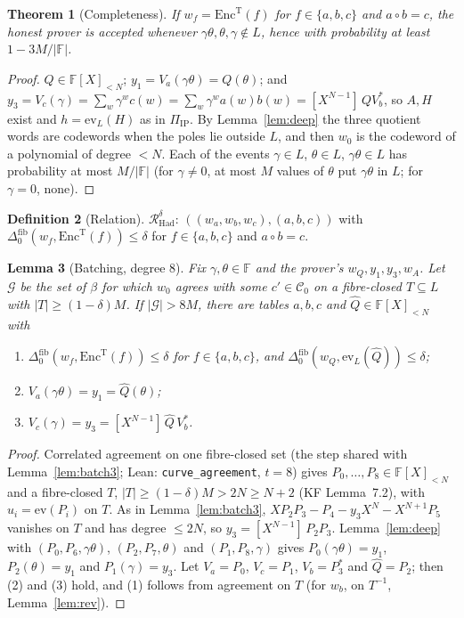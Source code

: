 \documentclass[11pt]{article}
\newtheorem{theorem}{Theorem}
\newtheorem{lemma}[theorem]{Lemma}
\theoremstyle{definition}
\newtheorem{definition}[theorem]{Definition}
\newcommand{\F}{\mathbb{F}}
\newcommand{\coef}[2]{[X^{#1}]\,#2}
\newcommand{\ev}{\mathrm{ev}}
\newcommand{\Cc}{\mathcal{C}}
\begin{document}
\begin{theorem}[Completeness]
If $w_f=\mathrm{Enc}^{\mathrm T}(f)$ for $f\in\{a,b,c\}$ and $a\circ b=c$, the honest prover is accepted whenever $\gamma\theta,\theta,\gamma\notin L$, hence with probability at least $1-3M/|\F|$.
\end{theorem}
\begin{proof}
$Q\in\F[X]_{<N}$; $y_1=V_a(\gamma\theta)=Q(\theta)$; and $y_3=V_c(\gamma)=\sum_w\gamma^wc(w)=\sum_w\gamma^wa(w)b(w)=\coef{N-1}{QV_b^\ast}$, so $A,H$ exist and $h=\ev_L(H)$ as in $\Pi_{\mathrm{IP}}$.
By Lemma~\ref{lem:deep} the three quotient words are codewords when the poles lie outside $L$, and then $w_0$ is the codeword of a polynomial of degree $<N$.
Each of the events $\gamma\in L$, $\theta\in L$, $\gamma\theta\in L$ has probability at most $M/|\F|$ (for $\gamma\ne0$, at most $M$ values of $\theta$ put $\gamma\theta$ in $L$; for $\gamma=0$, none).
\end{proof}

\begin{definition}[Relation]
$\mathcal R^\delta_{\mathrm{Had}}$: $((w_a,w_b,w_c),(a,b,c))$ with $\Delta^{\mathrm{fib}}_0(w_f,\mathrm{Enc}^{\mathrm T}(f))\le\delta$ for $f\in\{a,b,c\}$ and $a\circ b=c$.
\end{definition}

\begin{lemma}[Batching, degree $8$]\label{lem:batch8}
Fix $\gamma,\theta\in\F$ and the prover's $w_Q,y_1,y_3,w_A$.
Let $\mathcal G$ be the set of $\beta$ for which $w_0$ agrees with some $c'\in\Cc_0$ on a fibre-closed $T\subseteq L$ with $|T|\ge(1-\delta)M$.
If $|\mathcal G|>8M$, there are tables $a,b,c$ and $\hat Q\in\F[X]_{<N}$ with
\begin{enumerate}[nosep]
\item $\Delta^{\mathrm{fib}}_0(w_f,\mathrm{Enc}^{\mathrm T}(f))\le\delta$ for $f\in\{a,b,c\}$, and $\Delta^{\mathrm{fib}}_0(w_Q,\ev_L(\hat Q))\le\delta$;
\item $V_a(\gamma\theta)=y_1=\hat Q(\theta)$;
\item $V_c(\gamma)=y_3=\coef{N-1}{\hat Q\,V_b^\ast}$.
\end{enumerate}
\end{lemma}
\begin{proof}
Correlated agreement on one fibre-closed set (the step shared with Lemma~\ref{lem:batch3}; Lean: \texttt{curve\_agreement}, $t=8$) gives $P_0,\dots,P_8\in\F[X]_{<N}$ and a fibre-closed $T$, $|T|\ge(1-\delta)M>2N\ge N+2$ (KF Lemma~7.2), with $u_i=\ev(P_i)$ on $T$.
As in Lemma~\ref{lem:batch3}, $XP_2P_3-P_4-y_3X^N-X^{N+1}P_5$ vanishes on $T$ and has degree $\le2N$, so $y_3=\coef{N-1}{P_2P_3}$.
Lemma~\ref{lem:deep} with $(P_0,P_6,\gamma\theta)$, $(P_2,P_7,\theta)$ and $(P_1,P_8,\gamma)$ gives $P_0(\gamma\theta)=y_1$, $P_2(\theta)=y_1$ and $P_1(\gamma)=y_3$.
Let $V_a=P_0$, $V_c=P_1$, $V_b=P_3^\ast$ and $\hat Q=P_2$; then (2) and (3) hold, and (1) follows from agreement on $T$ (for $w_b$, on $T^{-1}$, Lemma~\ref{lem:rev}).
\end{proof}
\end{document}
